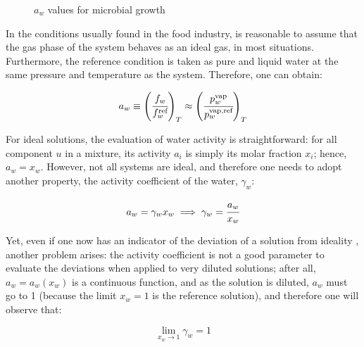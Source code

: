 \documentclass[
	12pt,				%
	openright,
	twoside,
	a4paper,			%
	brazil,			%
	french,				%
	spanish,			%
	english				%
	]{abntex2}
\begin{document}
\begin{figure}[h]
	\caption{$a_w$ values for microbial growth}
	\label{fig:germ}
\end{figure}

In the conditions usually found in the food industry, is reasonable to assume
that the gas phase of the system behaves as an ideal gas\cite{canovas2007},
in most situations. Furthermore, the reference condition is taken as pure and liquid
water at the same pressure and temperature as the system. Therefore, one can obtain:

\begin{equation}
	\label{eq:def_atv}
	a_w \equiv \left(\cfrac{f_w}{f^\text{ref}_w}\right)_T%
		\approx \left(\cfrac{p^\text{vap}_w}{p^\text{vap,ref}_w}\right)_T
\end{equation}

For ideal solutions, the evaluation of water activity is straightforward: for all
component $u$ in a mixture, its activity $a_i$ is simply its molar fraction $x_i$;
hence, $a_w = x_w$. However, not all systems are ideal, and therefore one needs to
adopt another property, the activity coefficient of the water, $\gamma_w$:

\begin{equation}
	a_w = \gamma_wx_w \implies \gamma_w = \cfrac{a_w}{x_w}
\end{equation}

Yet, even if one now has an indicator of the deviation of a solution from
ideality , another problem arises: the activity coefficient is not a good
parameter to evaluate the deviations when applied to very diluted solutions;
after all, $a_w=a_w(x_w)$ is a continuous function, and as the solution is diluted,
$a_w$ must go to 1 (because the limit $x_w=1$ is the reference solution), and
therefore one will observe that:

\begin{equation}
	\lim_{x_w \to 1}\gamma_w = 1
\end{equation}
\end{document}
